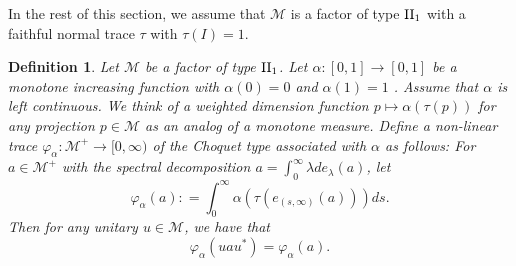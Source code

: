 \documentclass[a4paper,12pt]{amsart}
\newtheorem{definition}{Definition}[section]
\newcommand{\M}{\mathcal{M}}
\begin{document}
In the rest of this section, we assume that $\M$ is a factor of type ${\rm II}_1$ with a faithful normal trace 
$\tau$  with $\tau(I) = 1.$ 

\begin{definition} \rm Let $\M$ be a factor of  type ${\rm II}_1$.
Let $\alpha: [0,1]  \rightarrow [0, 1]$ be a 
monotone increasing function with $\alpha(0) = 0$ and $\alpha(1) = 1$ .   Assume that $\alpha$ is left continuous. 
We think of a weighted dimension function $p \mapsto \alpha(\tau(p))$ for any projection $p \in \M$ as an analog of 
a monotone measure.  
Define a non-linear trace $\varphi_{\alpha} : \M^+ \rightarrow  [0, \infty)$ of the Choquet type associated with $\alpha$ 
as follows: For $a \in \M^+$ with the spectral decomposition $a = \int_0^{\infty} \lambda d e_{\lambda}(a)$,  let  
$$
\varphi_{\alpha}(a) : = \int_0^{\infty}  \alpha(\tau(e_{(s,\infty)}(a)))ds. 
$$
Then for any unitary $u \in \M$, we have that 
$$
\varphi_{\alpha}(uau^*) =  \varphi_{\alpha}(a). 
$$
\end{definition}
\end{document}
